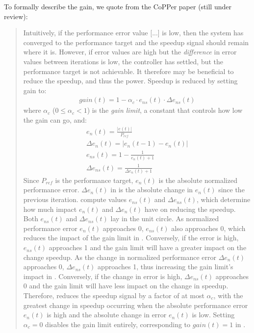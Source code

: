 To formally describe the gain, we quote from the CoPPer paper (still under review):
\begin{quote}
Intuitively, if the performance error value [...] is low, then the system
has converged to the performance target and the speedup signal should
remain where it is.  However, if error values are high but the
\emph{difference} in error values between iterations is low, the controller
has settled, but the performance target is not achievable.  It
therefore may be beneficial to reduce the speedup, and thus the power.
Speedup is reduced by setting gain to:
\begin{eqnarray}
  gain(t) = 1 - \alpha_c \cdot e_{ns}(t) \cdot \Delta e_{ns}(t)
  \label{eqn:cost-pole}
\end{eqnarray}
where $\alpha_c$ ($0 \le \alpha_c < 1$) is the \emph{gain limit}, a
constant that controls how low the gain can go, and:
\begin{eqnarray}
  e_n(t) = \frac{|e(t)|}{P_{ref}}
  \label{eqn:en} \\
  \Delta e_n(t) = \left| e_n(t-1) - e_n(t) \right|
  \label{eqn:den} \\
  e_{ns}(t) = 1 - \frac{1}{e_{n}(t)+1}
  \label{eqn:ens} \\
  \Delta e_{ns}(t) = \frac{1}{\Delta e_{n}(t)+1}
  \label{eqn:dens}
\end{eqnarray}
Since $P_{ref}$ is the performance target, $e_n(t)$ is the absolute normalized performance error.
$\Delta e_n(t)$ in  is the absolute change in $e_n(t)$ since the previous
iteration.   compute values $e_{ns}(t)$ and $\Delta
e_{ns}(t)$, which determine how much impact $e_n(t)$ and $\Delta
e_{n}(t)$ have on reducing the speedup.  Both $e_{ns}(t)$ and $\Delta
e_{ns}(t)$ lay in the unit circle.  As normalized performance error
$e_n(t)$ approaches 0, $e_{ns}(t)$ also approaches 0, which reduces
the impact of the gain limit in .  Conversely, if
the error is high, $e_{ns}(t)$ approaches 1 and the gain limit will
have a greater impact on the change speedup.  As the change in
normalized performance error $\Delta e_{n}(t)$ approaches 0, $\Delta
e_{ns}(t)$ approaches 1, thus increasing the gain limit's impact in
.  Conversely, if the change in error is high,
$\Delta e_{ns}(t)$ approaches 0 and the gain limit will have less
impact on the change in speedup.  Therefore, 
reduces the speedup signal by a factor of at most $\alpha_c$, with the
greatest change in speedup occurring when the absolute performance
error $e_n(t)$ is high and the absolute change in error $e_n(t)$ is
low.  Setting $\alpha_c=0$ disables the gain limit entirely,
corresponding to $gain(t) =1 $ in .
\end{quote}


